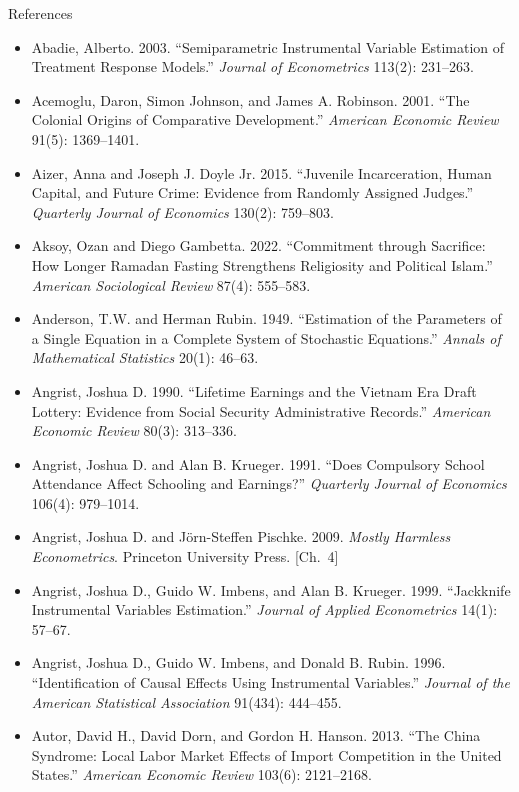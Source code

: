 \documentclass[aspectratio=169,11pt,xcolor=dvipsnames]{beamer}
\begin{document}
\begin{frame}[allowframebreaks,t]{References}
\footnotesize
\begin{itemize}\itemsep3pt
\item Abadie, Alberto. 2003. ``Semiparametric Instrumental Variable Estimation of Treatment Response Models.'' \textit{Journal of Econometrics} 113(2): 231--263.
\item Acemoglu, Daron, Simon Johnson, and James A. Robinson. 2001. ``The Colonial
Origins of Comparative Development.'' \textit{American Economic Review} 91(5):
1369--1401.
\item Aizer, Anna and Joseph J. Doyle Jr. 2015. ``Juvenile Incarceration, Human Capital, and Future Crime: Evidence from Randomly Assigned Judges.'' \textit{Quarterly Journal of Economics} 130(2): 759--803.
\item Aksoy, Ozan and Diego Gambetta. 2022. ``Commitment through Sacrifice: How Longer Ramadan Fasting Strengthens Religiosity and Political Islam.'' \textit{American Sociological Review} 87(4): 555--583.
\item Anderson, T.W. and Herman Rubin. 1949. ``Estimation of the Parameters of a
Single Equation in a Complete System of Stochastic Equations.''
\textit{Annals of Mathematical Statistics} 20(1): 46--63.
\item Angrist, Joshua D. 1990. ``Lifetime Earnings and the Vietnam Era Draft Lottery: Evidence from Social Security Administrative Records.'' \textit{American Economic Review} 80(3): 313--336.
\item Angrist, Joshua D. and Alan B. Krueger. 1991. ``Does Compulsory School
Attendance Affect Schooling and Earnings?'' \textit{Quarterly Journal of
Economics} 106(4): 979--1014.
\item Angrist, Joshua D. and J\"orn-Steffen Pischke. 2009.
\textit{Mostly Harmless Econometrics}. Princeton University Press. [Ch.\ 4]
\item Angrist, Joshua D., Guido W. Imbens, and Alan B. Krueger. 1999. ``Jackknife Instrumental Variables Estimation.'' \textit{Journal of Applied Econometrics} 14(1): 57--67.
\item Angrist, Joshua D., Guido W. Imbens, and Donald B. Rubin. 1996.
``Identification of Causal Effects Using Instrumental Variables.''
\textit{Journal of the American Statistical Association} 91(434): 444--455.
\item Autor, David H., David Dorn, and Gordon H. Hanson. 2013. ``The China Syndrome: Local Labor Market Effects of Import Competition in the United States.'' \textit{American Economic Review} 103(6): 2121--2168.

\end{itemize}
\end{frame}
\end{document}
